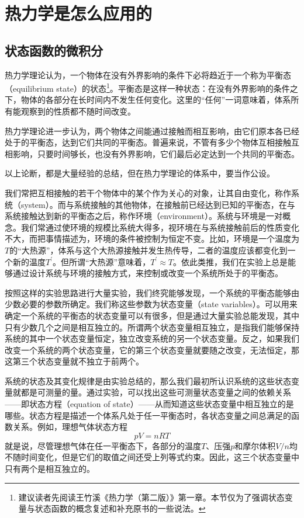 \documentclass[main.tex]{subfiles}
\begin{document}
\section{热力学是怎么应用的}\label{I.2 pratical_thermodynamics}
\subsection{状态函数的微积分}
热力学理论认为，一个物体在没有外界影响的条件下必将趋近于一个称为平衡态（equilibrium state）的状态\footnote{建议读者先阅读王竹溪《热力学（第二版）》第一章。本节仅为了强调状态变量与状态函数的概念复述和补充原书的一些说法。}。平衡态是这样一种状态：在没有外界影响的条件之下，物体的各部分在长时间内不发生任何变化。这里的“任何”一词意味着，体系所有能观察到的性质都不随时间改变。

热力学理论进一步认为，两个物体之间能通过接触而相互影响，由它们原本各已经处于的平衡态，达到它们共同的平衡态。普遍来说，不管有多少个物体互相接触互相影响，只要时间够长，也没有外界影响，它们最后必定达到一个共同的平衡态。

以上论断，都是大量经验的总结，但在热力学理论的体系中，要当作公设。

我们常把互相接触的若干个物体中的某个作为关心的对象，让其自由变化，称作系统（system）。而与系统接触的其他物体，在接触前已经达到已知的平衡态，在与系统接触达到新的平衡态之后，称作环境（environment）。系统与环境是一对概念。我们常通过使环境的规模比系统大得多，视环境在与系统接触前后的性质变化不大，而把事情描述为，环境的条件被控制为恒定不变。比如，环境是一个温度为$T$的“大热源”，体系与这个大热源接触并发生热传导，二者的温度应该都变化到一个新的温度$T^\prime$。但所谓“大热源”意味着，$T^\prime\approx T$。依此类推，我们在实验上总是能够通过设计系统与环境的接触方式，来控制或改变一个系统所处于的平衡态。

按照这样的实验思路进行大量实验，我们终究能够发现，一个系统的平衡态能够由少数必要的参数所确定。我们称这些参数为状态变量（state variables）。可以用来确定一个系统的平衡态的状态变量可以有很多，但是通过大量实验总能发现，其中只有少数几个之间是相互独立的。所谓两个状态变量相互独立，是指我们能够保持系统的其中一个状态变量恒定，独立改变系统的另一个状态变量。反之，如果我们改变一个系统的两个状态变量，它的第三个状态变量就要随之改变，无法恒定，那这第三个状态变量就不独立于前两个。

系统的状态及其变化规律是由实验总结的，那么我们最初所认识系统的这些状态变量就都是可测量的量。通过实验，可以找出这些可测量状态变量之间的依赖关系——即状态方程（equation of state）——从而知道这些状态变量中相互独立的是哪些。状态方程是描述一个体系凡处于任一平衡态时，各状态变量之间总满足的函数关系。例如，理想气体状态方程
\[pV=nRT\]
就是说，尽管理想气体在任一平衡态下，各部分的温度$T$、压强$p$和摩尔体积$V/n$均不随时间变化，但是它们的取值之间还受上列等式约束。因此，这三个状态变量中只有两个是相互独立的。
\end{document}
